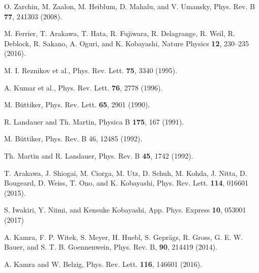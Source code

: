 \documentclass[aps,prl,reprint,showpacs]{revtex4-1}
\begin{document}
\begin{thebibliography}{10}
O. Zarchin, M. Zaalon, M. Heiblum, D. Mahalu, and V. Umansky,  
Phys. Rev. B {\bf 77}, 241303 (2008).

M. Ferrier, T. Arakawa, T. Hata, R. Fujiwara, R. Delagrange, R. Weil, R. Deblock, R. Sakano, A. Oguri, and K. Kobayashi, Nature Physics {\bf 12}, 230–235 (2016).

M. I. Reznikov et al., Phys. Rev. Lett. {\bf 75}, 3340 (1995).

A. Kumar et al., Phys. Rev. Lett. {\bf 76}, 2778 (1996).

M. B\"uttiker, Phys. Rev. Lett. {\bf 65}, 2901 (1990).

R. Landauer and Th. Martin, Physica B {\bf 175}, 167 (1991).

M. B\"uttiker, Phys. Rev. B 46, 12485 (1992).

Th. Martin and R. Landauer, Phys. Rev. B {\bf 45}, 1742 (1992).

T. Arakawa, J. Shiogai, M. Ciorga, M. Utz, D. Schuh, M. Kohda, J. Nitta, D. Bougeard, D. Weiss, T. Ono, and K. Kobayashi, Phys. Rev. Lett. {\bf 114}, 016601 (2015).

S. Iwakiri, Y. Niimi, and Kensuke Kobayashi, App. Phys. Express {\bf 10}, 053001 (2017)

A. Kamra, F. P. Witek, S. Meyer, H. Huebl, S. Gepr\"ags, R. Gross, G. E. W. Bauer, and S. T. B. Goennenwein, 
Phys. Rev. B, {\bf 90}, 214419 (2014).

A. Kamra and W. Belzig, Phys. Rev. Lett. {\bf 116}, 146601 (2016).


\end{thebibliography}
\end{document}
